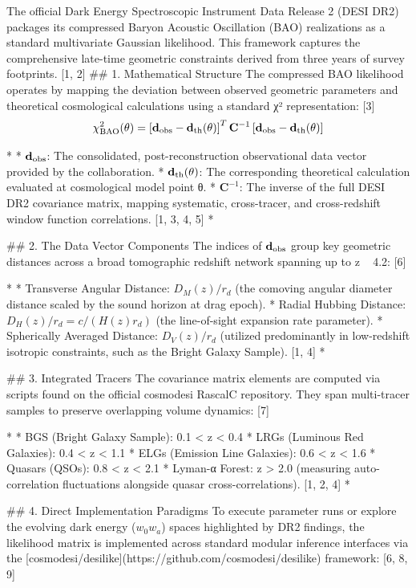 The official Dark Energy Spectroscopic Instrument Data Release 2 (DESI DR2) packages its compressed Baryon Acoustic Oscillation (BAO) realizations as a standard multivariate Gaussian likelihood. This framework captures the comprehensive late-time geometric constraints derived from three years of survey footprints. [1, 2] 
## 1. Mathematical Structure
The compressed BAO likelihood operates by mapping the deviation between observed geometric parameters and theoretical cosmological calculations using a standard χ² representation: [3] 
$$\chi^2_{\rm BAO}(\theta) = \left[ \mathbf{d}_{\rm obs} - \mathbf{d}_{\rm th}(\theta) \right]^T \mathbf{C}^{-1} \left[ \mathbf{d}_{\rm obs} - \mathbf{d}_{\rm th}(\theta) \right]$$ 

* 
* $\mathbf{d}_{\rm obs}$: The consolidated, post-reconstruction observational data vector provided by the collaboration.
* $\mathbf{d}_{\rm th}(\theta)$: The corresponding theoretical calculation evaluated at cosmological model point θ.
* $\mathbf{C}^{-1}$: The inverse of the full DESI DR2 covariance matrix, mapping systematic, cross-tracer, and cross-redshift window function correlations. [1, 3, 4, 5] 
* 

## 2. The Data Vector Components
The indices of $\mathbf{d}_{\rm obs}$ group key geometric distances across a broad tomographic redshift network spanning up to z ~ 4.2: [6] 

* 
* Transverse Angular Distance: $D_M(z)/r_d$ (the comoving angular diameter distance scaled by the sound horizon at drag epoch).
* Radial Hubbing Distance: $D_H(z)/r_d = c / (H(z) r_d)$ (the line-of-sight expansion rate parameter).
* Spherically Averaged Distance: $D_V(z)/r_d$ (utilized predominantly in low-redshift isotropic constraints, such as the Bright Galaxy Sample). [1, 4] 
* 

## 3. Integrated Tracers
The covariance matrix elements are computed via scripts found on the official cosmodesi RascalC repository. They span multi-tracer samples to preserve overlapping volume dynamics: [7] 

* 
* BGS (Bright Galaxy Sample): 0.1 < z < 0.4
* LRGs (Luminous Red Galaxies): 0.4 < z < 1.1
* ELGs (Emission Line Galaxies): 0.6 < z < 1.6
* Quasars (QSOs): 0.8 < z < 2.1
* Lyman-α Forest: z > 2.0 (measuring auto-correlation fluctuations alongside quasar cross-correlations). [1, 2, 4] 
* 

## 4. Direct Implementation Paradigms
To execute parameter runs or explore the evolving dark energy ($w_0w_a$) spaces highlighted by DR2 findings, the likelihood matrix is implemented across standard modular inference interfaces via the [cosmodesi/desilike](https://github.com/cosmodesi/desilike) framework: [6, 8, 9] 

